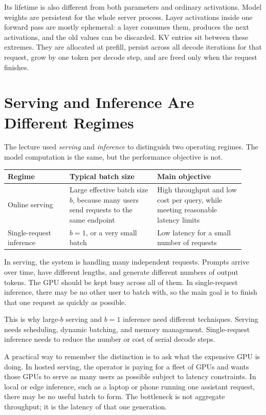 \documentclass[11pt]{article}
\begin{document}
Its lifetime is also different from both parameters and ordinary activations.  Model weights are persistent for the whole server process.  Layer activations inside one forward pass are mostly ephemeral: a layer consumes them, produces the next activations, and the old values can be discarded.  KV entries sit between these extremes.  They are allocated at prefill, persist across all decode iterations for that request, grow by one token per decode step, and are freed only when the request finishes.

\section{Serving and Inference Are Different Regimes}

The lecture used \emph{serving} and \emph{inference} to distinguish two operating regimes.  The model computation is the same, but the performance objective is not.

\begin{center}
\begin{tabular}{@{}p{0.24\linewidth}p{0.34\linewidth}p{0.34\linewidth}@{}}
\toprule
Regime & Typical batch size & Main objective \\
\midrule
Online serving & Large effective batch size \(b\), because many users send requests to the same endpoint & High throughput and low cost per query, while meeting reasonable latency limits \\
Single-request inference & \(b=1\), or a very small batch & Low latency for a small number of requests \\
\bottomrule
\end{tabular}
\end{center}

In serving, the system is handling many independent requests.  Prompts arrive over time, have different lengths, and generate different numbers of output tokens.  The GPU should be kept busy across all of them.  In single-request inference, there may be no other user to batch with, so the main goal is to finish that one request as quickly as possible.

This is why large-\(b\) serving and \(b=1\) inference need different techniques.  Serving needs scheduling, dynamic batching, and memory management.  Single-request inference needs to reduce the number or cost of serial decode steps.

A practical way to remember the distinction is to ask what the expensive GPU is doing.  In hosted serving, the operator is paying for a fleet of GPUs and wants those GPUs to serve as many users as possible subject to latency constraints.  In local or edge inference, such as a laptop or phone running one assistant request, there may be no useful batch to form.  The bottleneck is not aggregate throughput; it is the latency of that one generation.
\end{document}
